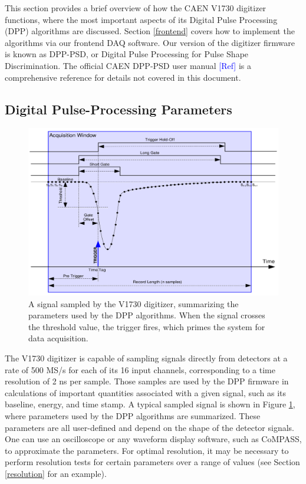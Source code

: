 This section provides a brief overview of how the CAEN V1730 digitizer functions, where the most important aspects of its Digital Pulse Processing (DPP) algorithms are discussed. Section \ref{frontend} covers how to implement the algorithms via our frontend DAQ software. Our version of the digitizer firmware is known as DPP-PSD, or Digital Pulse Processing for Pulse Shape Discrimination. The official CAEN DPP-PSD user manual \textcolor{blue}{[Ref]} %
is a comprehensive reference for details not covered in this document. 


\subsection{Digital Pulse-Processing Parameters} \label{DPP}

\begin{figure}[b!]
\centering
\includegraphics[scale=0.3]{Chapter-5/figs/trigger.png}
\caption{A signal sampled by the V1730 digitizer, summarizing the parameters used by the DPP algorithms. When the signal crosses the threshold value, the trigger fires, which primes the system for data acquisition.}
\label{trigger}
\end{figure}

The V1730 digitizer is capable of sampling signals directly from detectors at a rate of 500 MS/s for each of its 16 input channels, corresponding to a time resolution of 2 ns per sample. Those samples are used by the DPP firmware in calculations of important quantities associated with a given signal, such as its baseline, energy, and time stamp. A typical sampled signal is shown in Figure \ref{trigger}, where parameters used by the DPP algorithms are summarized. These parameters are all user-defined and depend on the shape of the detector signals. One can use an oscilloscope or any waveform display software, such as CoMPASS, to approximate the parameters. For optimal resolution, it may be necessary to perform resolution tests for certain parameters over a range of values (see Section \ref{resolution} for an example).

